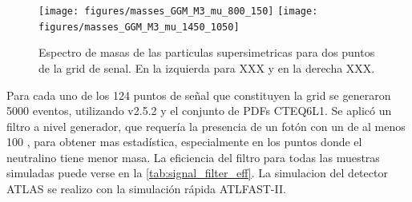 \begin{figure}[!htbp]
   \centering
   \texttt{[image: figures/masses\_GGM\_M3\_mu\_800\_150]}
   \texttt{[image: figures/masses\_GGM\_M3\_mu\_1450\_1050]}

   \caption{Espectro de masas de las particulas supersimetricas para dos puntos de la grid de senal.
     En la izquierda para XXX y en la derecha XXX.}
   \label{fig:mass_spectra}
\end{figure}

Para cada uno de los 124 puntos de señal que constituyen la grid se generaron
5000 eventos, utilizando {\herwigpp} v2.5.2\cite{Bahr:2008pv} y el conjunto de
PDFs CTEQ6L1\cite{Nadolsky:2008zw}. Se aplicó un filtro a nivel generador, que
requería la presencia de un fotón con un {\pt} de al menos 100 \gev, para
obtener mas estadística, especialmente en los puntos donde el
neutralino tiene menor masa. La eficiencia del filtro para todas las muestras
simuladas puede verse en la \cref{tab:signal_filter_eff}. La simulacion del
detector ATLAS se realizo con la simulación rápida
\textsc{ATLFAST-II}\cite{Richter-Was:683751}.



